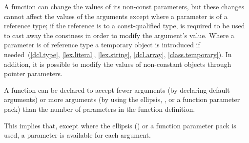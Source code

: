 \pnum
\begin{note}
%
%
%
%
%
%
A function can change the values of its non-const parameters, but these
changes cannot affect the values of the arguments except where a
parameter is of a reference type; if the reference is to
a const-qualified type,  is required to be used to
cast away the constness in order to modify the argument's value. Where a
parameter is of  reference type a temporary object is
introduced if
needed~(\ref{dcl.type}, \ref{lex.literal}, \ref{lex.string}, \ref{dcl.array}, \ref{class.temporary}).
In addition, it is possible to modify the values of non-constant objects through
pointer parameters.
\end{note}

\pnum
{}%
%
A function can be declared to accept fewer arguments (by declaring default
arguments) or more arguments (by using the ellipsis,
, or a function parameter pack) than the number of
parameters in the function definition.
\begin{note}
This implies that, except where the ellipsis () or a function
parameter pack is used, a parameter is available for each argument.
\end{note}


